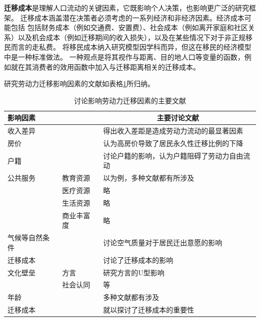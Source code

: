 \documentclass[a4paper, zihao=-4, fontset = mac, oneside]{ctexbook} %
\begin{document}
\textbf{迁移成本}是理解人口流动的关键因素，它既影响个人决策，也影响更广泛的研究框架。
迁移成本涵盖潜在决策者必须考虑的一系列经济和非经济因素。经济成本可能包括
包括财务成本（例如交通费、安置费）、社会成本（例如离开家庭和社区关系）以及机会成本（例如迁移期间的收入损失），以及在某些情况下对于非正规移民而言的走私费。
将移民成本纳入研究模型因学科而异，但这在移民的经济模型中是一种标准做法。 
一种观点是将其视作与距离、目的地人口等变量的函数，例如\textcite{LiuChenHuiLaoDongLiLiuDongJiNengPiPeiYuDiQuJingJiChaiJu2022}就在其消费者的效用函数中加入与迁移距离相关的迁移成本。


研究劳动力迁移影响因素的文献如表格\ref{tab:影响劳动力迁移的因素}所归纳。

\begin{table}[!ht]
\centering
\caption{讨论影响劳动力迁移因素的主要文献}
\begin{tabularx}{\textwidth}{@{}llX@{}}
\toprule
\textbf{影响因素} &  & \multicolumn{1}{c}{\textbf{主要讨论文献}} \\ 
\midrule
收入差异 &  &  \textcite{kennanEffectExpectedIncome2011}得出收入差距是造成劳动力流动的最显著因素\\
房价 &  &  \textcite{ZhangLiFangJieRuHeYingXiangLaoDongLiLiuDong2017}认为高房价导致了居民永久性迁移比例的下降\\
户籍 &  & \textcite{ngaiChinasMobilityBarriers2019}讨论户籍的影响，认为户籍阻碍了劳动力自由流动\\
公共服务 &  教育资源&  以\textcite{XiaYiRanChengShiJianDeMengMuSanQianGongGongFuWuYingXiangLaoDongLiLiuXiangDeJingYanYanJiu2015}为例，多种文献都有所涉及\\
  & 医疗资源 & 略\\
  & 生活资源 & 略\\
  & 商业丰富度 & 略\\
气候等自然条件 &  &  \textcite{HongDaYongDiWeiChaiYiGuaYingXingYuJiXiaoQiDaiKongQiWuRanYouZhiDeJuMinQianChuYiXiangFenYiYanJiu2016}讨论空气质量对于居民迁出意愿的影响\\
迁移成本 &  &  \textcite{WangLiLiWoGuoRenKouQianYiChengBenChengShiGuiMoYuShengChanLu2020}讨论了迁移成本的影响\\
文化壁垒 & 方言 &  \textcite{LiuYuYunLaoDongLiKuaFangYanLiuDongDeDaoUXingMoShi2015}研究方言的U型影响\\
  & 社会认同 &  \textcite{ZhangWenHongChengShiXinYiMinSheHuiRenTongDeJieGouMoXing2009}等\\
年龄 & & 多种文献都有涉及\\
迁移成本 & & \textcite{todaroModelLaborMigration1969}就以探讨了迁移成本的重要性\\
\bottomrule
\end{tabularx}
\label{tab:影响劳动力迁移的因素}
\end{table}
\end{document}
